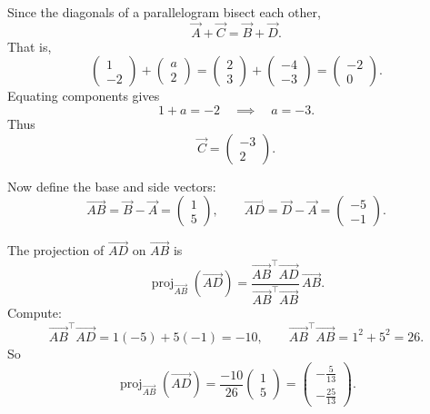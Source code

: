 \documentclass[journal]{IEEEtran}
\begin{document}
Since the diagonals of a parallelogram bisect each other,
\begin{equation}
\vec A+\vec C = \vec B+\vec D.
\end{equation}
That is,
\begin{equation}
\begin{pmatrix}1\\-2\end{pmatrix}+\begin{pmatrix}a\\2\end{pmatrix}
=\begin{pmatrix}2\\3\end{pmatrix}+\begin{pmatrix}-4\\-3\end{pmatrix}
=\begin{pmatrix}-2\\0\end{pmatrix}.
\end{equation}
Equating components gives
\begin{equation}
1+a=-2 \quad \implies \quad a=-3.
\end{equation}
Thus
\begin{equation}
\vec C=\begin{pmatrix}-3\\2\end{pmatrix}.
\end{equation}

Now define the base and side vectors:
\begin{equation}
\vec{AB}=\vec B-\vec A=\begin{pmatrix}1\\5\end{pmatrix}, \qquad
\vec{AD}=\vec D-\vec A=\begin{pmatrix}-5\\-1\end{pmatrix}.
\end{equation}

The projection of $\vec{AD}$ on $\vec{AB}$ is
\begin{equation}
\operatorname{proj}_{\vec{AB}}(\vec{AD})
=\frac{\vec{AB}^\top\vec{AD}}{\vec{AB}^\top\vec{AB}}\,\vec{AB}.
\end{equation}
Compute:
\begin{equation}
\vec{AB}^\top\vec{AD}=1(-5)+5(-1)=-10, \qquad
\vec{AB}^\top\vec{AB}=1^2+5^2=26.
\end{equation}
So
\begin{equation}
\operatorname{proj}_{\vec{AB}}(\vec{AD})
=\frac{-10}{26}\begin{pmatrix}1\\5\end{pmatrix}
=\begin{pmatrix}-\tfrac{5}{13}\\[4pt]-\tfrac{25}{13}\end{pmatrix}.
\end{equation}
\end{document}
